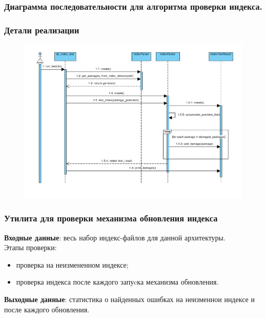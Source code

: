\documentclass{beamer}
\begin{document}
\begin{frame}
\frametitle{Диаграмма последовательности для алгоритма проверки индекса.}
\subsubsection{Детали реализации}
\begin{figure}
\begin{center}
\vspace{0cm}
\hspace*{-1cm}
\includegraphics[scale=0.4, clip]{../resources/uml/SimpleTestCase.pdf}
\end{center}
\end{figure}
\end{frame}


\begin{frame}
\frametitle{Утилита для проверки механизма обновления индекса}
\textbf{Входные данные}: весь набор индекс-файлов для данной архитектуры.\\
\vspace{0.5cm}
Этапы проверки:
\begin{itemize}
\item
проверка на неизмененном индексе;
\item
проверка индекса после каждого запуcка механизма обновления.
\end{itemize}
\textbf{Выходные данные}: статистика о найденных ошибках на неизменнои индексе
и после каждого обновления.
\end{frame}
\end{document}
